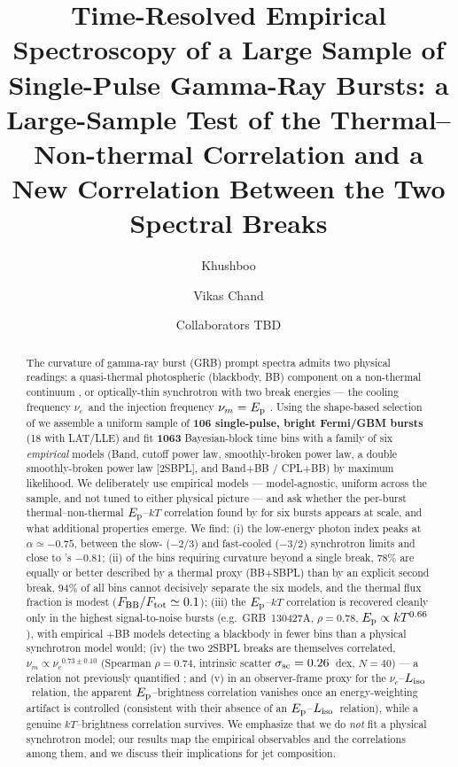 \documentclass[twocolumn]{aastex631}
\newcommand{\nuc}{\ensuremath{\nu_c}}
\newcommand{\num}{\ensuremath{\nu_m}}
\newcommand{\Ep}{\ensuremath{E_{\rm p}}}
\newcommand{\kT}{\ensuremath{kT}}
\newcommand{\Liso}{\ensuremath{L_{\rm iso}}}
\newcommand{\ssc}{\ensuremath{\sigma_{\rm sc}}}
\begin{document}
\title{Time-Resolved Empirical Spectroscopy of a Large Sample of Single-Pulse
Gamma-Ray Bursts: a Large-Sample Test of the Thermal--Non-thermal Correlation
and a New Correlation Between the Two Spectral Breaks}

\author{Khushboo}
\author{Vikas Chand}
\author{Collaborators TBD}

\begin{abstract}
The curvature of gamma-ray burst (GRB) prompt spectra admits two physical
readings: a quasi-thermal photospheric (blackbody, BB) component on a
non-thermal continuum \citep{Burgess2014a}, or optically-thin synchrotron with
two break energies --- the cooling frequency \nuc\ and the injection frequency
$\num=\Ep$ \citep{Ravasio2019,Mei2024}. Using the shape-based selection of
\citet{Busby2024} we assemble a uniform sample of \textbf{106 single-pulse,
bright Fermi/GBM bursts} (18 with LAT/LLE) and fit \textbf{1063} Bayesian-block
time bins with a family of six \emph{empirical} models (Band, cutoff power law,
smoothly-broken power law, a double smoothly-broken power law [2SBPL], and
Band$+$BB / CPL$+$BB) by maximum likelihood. We deliberately use empirical
models --- model-agnostic, uniform across the sample, and not tuned to either
physical picture --- and ask whether the per-burst thermal--non-thermal
$\Ep$--$\kT$ correlation found by \citet{Burgess2014a} for six bursts appears at
scale, and what additional properties emerge. We find: (i) the low-energy photon
index peaks at $\alpha\simeq-0.75$, between the slow- ($-2/3$) and fast-cooled
($-3/2$) synchrotron limits and close to \citeauthor{Burgess2014a}'s $-0.81$;
(ii) of the bins requiring curvature beyond a single break, $78\%$ are equally or
better described by a thermal proxy (BB$+$SBPL) than by an explicit second break,
$94\%$ of all bins cannot decisively separate the six models, and the thermal
flux fraction is modest ($F_{\rm BB}/F_{\rm tot}\simeq0.1$); (iii) the
$\Ep$--$\kT$ correlation is recovered cleanly only in the highest signal-to-noise
bursts (e.g.\ GRB~130427A, $\rho=0.78$, $\Ep\propto\kT^{0.66}$), with empirical
$+$BB models detecting a blackbody in fewer bins than a physical synchrotron
model would; (iv) the two 2SBPL breaks are themselves correlated,
$\num\propto\nuc^{0.73\pm0.10}$ (Spearman $\rho=0.74$, intrinsic scatter
$\ssc=0.26$~dex, $N=40$) --- a relation not previously quantified
\citep{Ravasio2019,Mei2024}; and (v) in an observer-frame proxy for the
\citet{Mei2024} $\nuc$--\Liso\ relation, the apparent $\Ep$--brightness
correlation vanishes once an energy-weighting artifact is controlled (consistent
with their absence of an $\Ep$--\Liso\ relation), while a genuine
$\kT$--brightness correlation survives. We emphasize that we do \emph{not} fit a
physical synchrotron model; our results map the empirical observables and the
correlations among them, and we discuss their implications for jet composition.
\end{abstract}
\end{document}
